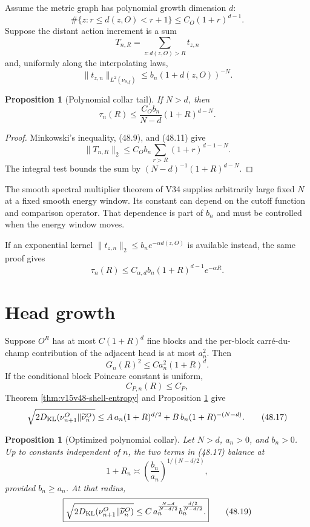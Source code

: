 \documentclass[11pt]{article}
\newtheorem{proposition}[theorem]{Proposition}
\theoremstyle{remark}
\begin{document}
Assume the metric graph has polynomial growth dimension \(d\):
\[
 \#\{z:r\leq d(z,O)<r+1\}\leq C_O(1+r)^{d-1}.           \tag{48.9}
\]
Suppose the distant action increment is a sum
\[
 T_{n,R}=\sum_{z:d(z,O)>R}t_{z,n}                       \tag{48.10}
\]
and, uniformly along the interpolating laws,
\[
 \|t_{z,n}\|_{L^2(\nu_{\theta,\xi})}
 \leq b_n(1+d(z,O))^{-N}.                               \tag{48.11}
\]

\begin{proposition}[Polynomial collar tail]
\label{prop:v15v48-tail}
If \(N>d\), then
\[
 \boxed{
 \tau_n(R)\leq
 \frac{C_Ob_n}{N-d}(1+R)^{d-N}.}                        \tag{48.12}
\]
\end{proposition}

\begin{proof}
Minkowski's inequality, (48.9), and (48.11) give
\[
 \|T_{n,R}\|_2
 \leq C_Ob_n
 \sum_{r>R}(1+r)^{d-1-N}.                               \tag{48.13}
\]
The integral test bounds the sum by
\((N-d)^{-1}(1+R)^{d-N}\).
\end{proof}

The smooth spectral multiplier theorem of V34 supplies arbitrarily
large fixed \(N\) at a fixed smooth energy window.  Its constant can
depend on the cutoff function and comparison operator.  That
dependence is part of \(b_n\) and must be controlled when the energy
window moves.

If an exponential kernel
\(\|t_{z,n}\|_2\leq b_ne^{-\alpha d(z,O)}\) is available instead,
the same proof gives
\[
 \tau_n(R)\leq C_{\alpha,d}b_n(1+R)^{d-1}e^{-\alpha R}. \tag{48.14}
\]

\section{Head growth}

Suppose \(O^R\) has at most \(C(1+R)^d\) fine blocks and the
per-block carré-du-champ contribution of the adjacent head is at
most \(a_n^2\).  Then
\[
 G_n(R)^2\leq C a_n^2(1+R)^d.                           \tag{48.15}
\]
If the conditional block Poincare constant is uniform,
\[
 C_{P,n}(R)\leq C_P,                                    \tag{48.16}
\]
Theorem \ref{thm:v15v48-shell-entropy} and Proposition
\ref{prop:v15v48-tail} give
\[
 \sqrt{2D_{\rm KL}(\nu_{n+1}^O\Vert\widetilde\nu_n^O)}
 \leq
 A\,a_n(1+R)^{d/2}
 +B\,b_n(1+R)^{-(N-d)}.                                 \tag{48.17}
\]

\begin{proposition}[Optimized polynomial collar]
\label{prop:v15v48-optimize}
Let \(N>d\), \(a_n>0\), and \(b_n>0\).  Up to constants independent
of \(n\), the two terms in (48.17) balance at
\[
 1+R_n\asymp
 \left(\frac{b_n}{a_n}\right)^{1/(N-d/2)},              \tag{48.18}
\]
provided \(b_n\geq a_n\).  At that radius,
\[
 \boxed{
 \sqrt{2D_{\rm KL}(\nu_{n+1}^O\Vert\widetilde\nu_n^O)}
 \leq
 C\,
 a_n^{\frac{N-d}{N-d/2}}
 b_n^{\frac{d/2}{N-d/2}}.}                              \tag{48.19}
\]
\end{proposition}
\end{document}
